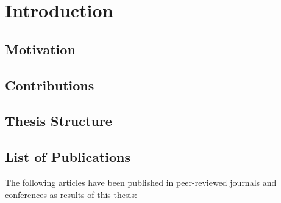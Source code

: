
\chapter{Introduction} %
\label{cha:introduction}
%
\section{Motivation} %
\label{sec:motivation}

%
\section{Contributions} %
\label{sec:contributions}

%
\section{Thesis Structure} %
\label{sec:thesis_structure}

%
\pagebreak
\section{List of Publications} %
\label{sec:list_of_publications}
%
The following articles have been published in peer-reviewed journals and
conferences as results of this thesis:
%
%

